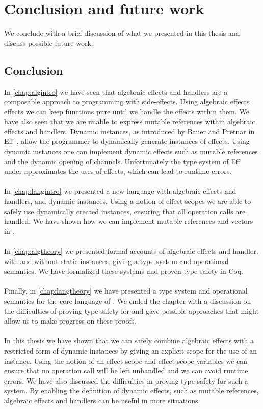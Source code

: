 \chapter{\label{chap:conclusion}Conclusion and future work}

We conclude with a brief discussion of what we presented in this thesis and discuss possible future work.

\section{Conclusion}
In \cref{chap:algintro} we have seen that algebraic effects and handlers are a composable approach to programming with side-effects.
Using algebraic effects effects we can keep functions pure until we handle the effects within them.
We have also seen that we are unable to express mutable references within algebraic effects and handlers.
Dynamic instances, as introduced by Bauer and Pretnar in Eff~\autocite{eff1}, allow the programmer to dynamically generate instances of effects.
Using dynamic instances one can implement dynamic effects such as mutable references and the dynamic opening of channels.
Unfortunately the type system of Eff under-approximates the uses of effects, which can lead to runtime errors.
\\\\
In \cref{chap:langintro} we presented a new language \lang{} with algebraic effects and handlers, and dynamic instances.
Using a notion of effect scopes we are able to safely use dynamically created instances, ensuring that all operation calls are handled.
We have shown how we can implement mutable references and vectors in \lang{}.
\\\\
In \cref{chap:algtheory} we presented formal accounts of algebraic effects and handler, with and without static instances, giving a type system and operational semantics.
We have formalized these systems and proven type safety in Coq.
\\\\
Finally, in \cref{chap:langtheory} we have presented a type system and operational semantics for the core language of \lang{}.
We ended the chapter with a discussion on the difficulties of proving type safety for \lang{} and gave possible approaches that might allow us to make progress on these proofs.
\\\\
In this thesis we have shown that we can safely combine algebraic effects with a restricted form of dynamic instances by giving an explicit scope for the use of an instance.
Using the notion of an effect scope and effect scope variables we can ensure that no operation call will be left unhandled and we can avoid runtime errors.
We have also discussed the difficulties in proving type safety for such a system.
By enabling the definition of dynamic effects, such as mutable references, algebraic effects and handlers can be useful in more situations.
 
